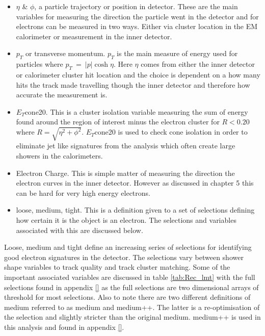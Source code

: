 	\begin{itemize}
	\item $\eta$ \& $\phi$, a particle trajectory or position in detector. These are the main variables for measuring the direction the particle went in the detector and for electrons can be measured in two ways. Either via cluster location in the EM calorimeter or measurement in the inner detector.
	\item $p_{T}$ or transverse momentum. $p_{T}$ is the main measure of energy used for particles where $p_{T}~=~|p|\cosh{\eta}$. Here $\eta$ comes from either the inner detector or calorimeter cluster hit location and the choice is dependent on a how many hits the track made travelling though the inner detector and therefore how accurate the measurement is.
	\item $E_{T}$cone20. This is a cluster isolation variable measuring the sum of energy found around the region of interest minus the electron cluster for $R < 0.20$ where $R = \sqrt{\eta^{2} + \phi^{2}}$. $E_{T}$cone20 is used to check cone isolation in order to eliminate jet like signatures from the analysis which often create large showers in the calorimeters.
	\item Electron Charge. This is simple matter of measuring the direction the electron curves in the inner detector. However as discussed in chapter 5 this can be hard for very high energy electrons.
	\item loose, medium, tight. This is a definition given to a set of selections defining how certain it is the object is an electron. The selections and variables associated with this are discussed below.
	\end{itemize}

	Loose, medium and tight define an increasing series of selections for identifying good electron signatures in the detector. The selections vary between shower shape variables to track quality and track cluster matching. Some of the important associated variables are discussed in table \ref{tab:Rec_lmt} with the full selections found in appendix \ref{} as the full selections are two dimensional arrays of threshold for most selections. Also to note there are two different definitions of medium referred to as medium and medium++. The latter is a re-optimisation of the selection and slightly stricter than the original medium. medium++ is used in this analysis and found in appendix \ref{}.

